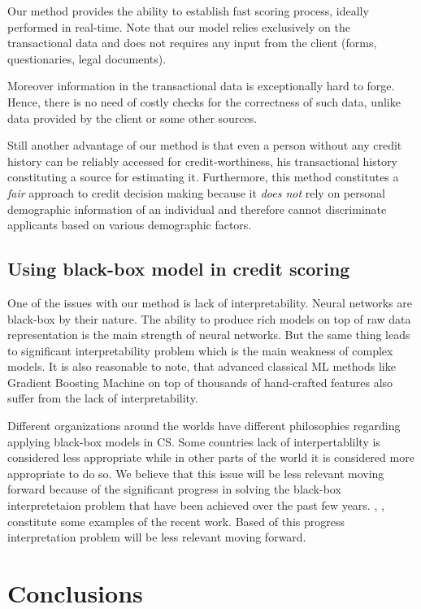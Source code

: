 \documentclass[sigconf]{acmart}
\begin{document}
Our method provides the ability to establish fast scoring process, ideally performed in real-time. Note that our model relies exclusively on the transactional data and does not requires any input from the client (forms, questionaries, legal documents).

Moreover information in the transactional data is exceptionally hard to forge. Hence, there is no need of costly checks for the correctness of such data, unlike data provided by the client or some other sources.

Still another advantage of our method is that even a person without any credit history can be reliably accessed for credit-worthiness, his transactional history constituting a source for estimating it.
Furthermore, this method constitutes a \textit{fair} approach to credit decision making because it \textit{does not} rely on personal demographic information of an individual and therefore cannot discriminate applicants based on various demographic factors.

\subsection{Using black-box model in credit scoring}

One of the issues with our method is lack of interpretability. Neural networks are black-box by their nature. The ability to produce rich models on top of raw data representation is the main strength of neural networks. But the same thing leads to significant interpretability problem which is the main weakness of complex models. It is also reasonable to note, that advanced classical ML methods like Gradient Boosting Machine on top of thousands of hand-crafted features also suffer from the lack of interpretability.

Different organizations around the worlds have different philosophies regarding applying black-box models in CS. Some countries lack of interpertablilty is considered less appropriate while in other parts of the world it is considered more appropriate to do so. We believe that this issue will be less relevant moving forward because of the significant progress in solving the black-box interpretetaion problem that have been achieved over the past few years. \cite{DBLP:journals/corr/ChoiBSSS16}, \cite{gupta2018lisa}, \cite{mccoy2018rnns} constitute some examples of the recent work. Based of this progress interpretation problem will be less relevant moving forward.

\section{Conclusions}
\end{document}
